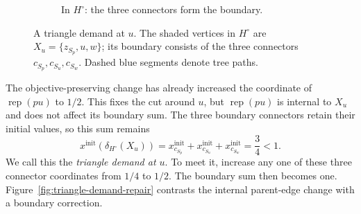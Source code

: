 \documentclass[11pt]{amsart}
\newcommand{\rep}[1]{\operatorname{rep}(#1)}
\newcommand{\1}{\mathbbm{1}}
\begin{document}
\begin{figure}[H]
\begin{subfigure}[t]{.51\textwidth}
\caption{In $H^\circ$: the three connectors form the boundary.}
\end{subfigure}
\caption{A triangle demand at $u$. The shaded vertices in $H^\circ$
are $X_u=\{z_{S_p},u,w\}$; its boundary consists of the three
connectors $c_{S_p},c_{S_u},c_{S_w}$. Dashed blue segments denote
tree paths.}
\label{fig:triangle-demand-construction}
\end{figure}

The objective-preserving change has already increased the
coordinate of $\rep{pu}$ to $1/2$. This fixes the cut around $u$,
but $\rep{pu}$ is internal to $X_u$ and does not affect its
boundary sum. The three boundary connectors retain their
initial values, so this sum remains
\[
    x^{\mathrm{init}}(\delta_{H^\circ}(X_u))
    =x^{\mathrm{init}}_{c_{S_p}}
     +x^{\mathrm{init}}_{c_{S_u}}
     +x^{\mathrm{init}}_{c_{S_w}}
    =\frac34<1.
\]
We call this the \emph{triangle demand at $u$}.
To meet it, increase any one of these three connector coordinates
from $1/4$ to $1/2$. The boundary sum then becomes one.
Figure~\ref{fig:triangle-demand-repair} contrasts the internal
parent-edge change with a boundary correction.
\end{document}
